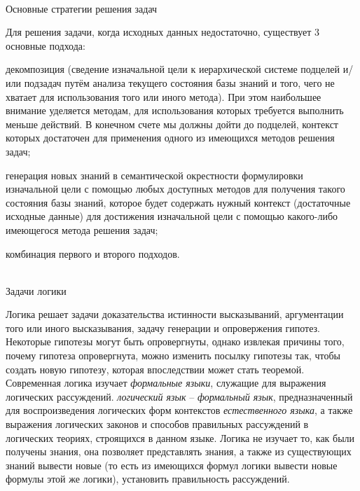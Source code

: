 \begin{frame}{\\Основные стратегии решения задач}
\topline
\justifying
\vspace{10mm}

    Для решения задачи, когда исходных данных недостаточно, существует 3 основные подхода:
    \begin{textitemize}
        \item декомпозиция (сведение изначальной цели к иерархической системе подцелей и/или подзадач путём анализа текущего состояния базы знаний и того, чего не хватает для использования того или иного метода). При этом наибольшее внимание уделяется методам, для использования которых требуется выполнить меньше действий. В конечном счете мы должны дойти до подцелей, контекст которых достаточен для применения одного из имеющихся методов решения задач;
        \item генерация новых знаний в семантической окрестности формулировки изначальной цели с помощью любых доступных методов для получения такого состояния базы знаний, которое будет содержать нужный контекст (достаточные исходные данные) для достижения изначальной цели с помощью какого-либо имеющегося метода решения задач;
        \item комбинация первого и второго подходов.
    \end{textitemize}
\end{frame}

\begin{frame}{\\Задачи логики}
\topline
\justifying
\vspace{10mm}

 
        Логика решает задачи доказательства истинности высказываний, аргументации того или иного высказывания, задачу генерации и опровержения гипотез. Некоторые гипотезы могут быть опровергнуты, однако извлекая причины того, почему гипотеза опровергнута, можно изменить посылку гипотезы так, чтобы создать новую гипотезу, которая впоследствии может стать теоремой.
        Современная логика изучает \textit{формальные языки}, служащие для выражения логических рассуждений. \textit{логический язык} -- \textit{формальный язык}, предназначенный для воспроизведения логических форм контекстов \textit{естественного языка}, а также выражения логических законов и способов правильных рассуждений в логических теориях, строящихся в данном языке. Логика не изучает то, как были получены знания, она позволяет представлять знания, а также из существующих знаний вывести новые (то есть из имеющихся формул логики вывести новые формулы этой же логики), установить правильность рассуждений.
\end{frame}

